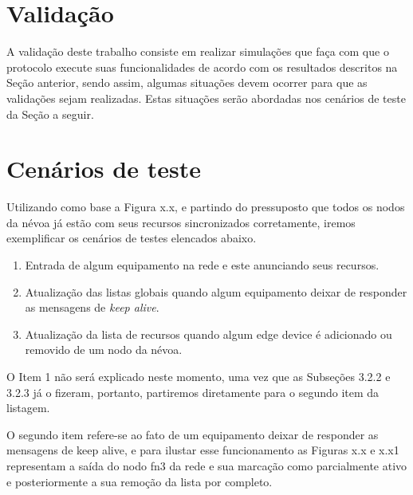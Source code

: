 \section{Validação}

A validação deste trabalho consiste em realizar simulações que faça com que o protocolo execute suas funcionalidades de acordo com os resultados descritos na Seção anterior, sendo assim, 
algumas situações devem ocorrer para que as validações sejam realizadas.
Estas situações serão abordadas nos cenários de teste da Seção a seguir.

\section{Cenários de teste}

Utilizando como base a Figura x.x, e partindo do pressuposto que todos os nodos da névoa já estão com seus recursos sincronizados corretamente,
iremos exemplificar os cenários de testes elencados abaixo.

\begin{enumerate}
    \item Entrada de algum equipamento na rede e este anunciando seus recursos. 
    \item Atualização das listas globais quando algum equipamento deixar de responder as mensagens de \textit{keep alive}.
    \item Atualização da lista de recursos quando algum edge device é adicionado ou removido de um nodo da névoa.
\end{enumerate}

O Item 1 não será explicado neste momento, uma vez que as Subseções 3.2.2 e 3.2.3 já o fizeram, portanto, partiremos diretamente para o segundo item da listagem.

O segundo item refere-se ao fato de um equipamento deixar de responder as mensagens de keep alive, e para ilustar esse funcionamento as Figuras x.x e x.x1 
representam a saída do nodo fn3 da rede e sua marcação como parcialmente ativo e posteriormente a sua remoção da lista por completo.
